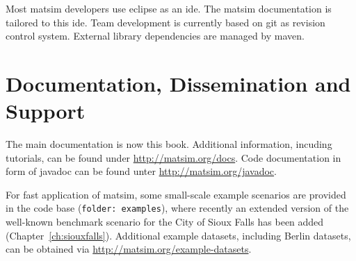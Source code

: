 Most \gls{matsim} developers use \gls{eclipse} as an \gls{ide}. The \gls{matsim} documentation is tailored to this \gls{ide}. Team development is currently based on \gls{git} as revision control system. External library dependencies are managed by \gls{maven}.

\section{Documentation, Dissemination and Support}

The main documentation is now this book.  Additional information, incuding tutorials, can be found under \url{http://matsim.org/docs}.
%
%
Code documentation in form of \gls{javadoc} can be found unter \url{http://matsim.org/javadoc}.

For fast application of \gls{matsim}, some small-scale example scenarios are provided in the code base (\lstinline|folder: examples|), where recently an extended version of the well-known benchmark scenario for the City of Sioux Falls has been added \citep[][]{ChakirovFourie_TechRep_FCL_2014} (Chapter~\ref{ch:siouxfalls}). %
Additional example datasets, including Berlin datasets, can be obtained via \url{http://matsim.org/example-datasets}.

